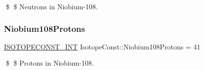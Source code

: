 \$ \$ Neutrons in Niobium-\/108. \mbox{\label{group___isotope_const-_niobium-_nb108_gac71e9903027e8c978f4e19f4f2e42629}} 
\subsubsection{\texorpdfstring{Niobium108\+Protons}{Niobium108Protons}}
{\footnotesize\ttfamily \mbox{\hyperlink{group___isotope_const-_macros_ga5f18360b3e99483a35c32d789e62621c}{I\+S\+O\+T\+O\+P\+E\+C\+O\+N\+S\+T\+\_\+\+I\+NT}} Isotope\+Const\+::\+Niobium108\+Protons = 41}

\$ \$ Protons in Niobium-\/108. 